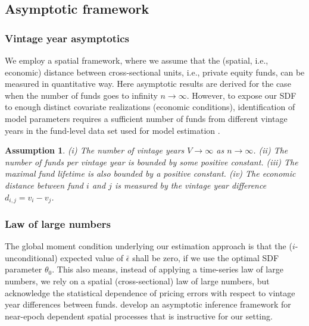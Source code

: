\documentclass[12pt]{article}
\newtheorem{assume}{Assumption}
\begin{document}
\subsection{Asymptotic framework}
\label{sec:asymptotic_framework}

\subsubsection{Vintage year asymptotics}
We employ a spatial framework, where we assume that the (spatial, i.e., economic) distance between cross-sectional units, i.e., private equity funds, can be measured in quantitative way.
Here asymptotic results are derived for the case when the number of funds goes to infinity $n \to \infty$.
However, to expose our SDF to enough distinct covariate realizations (economic conditions), identification of model parameters requires a sufficient number of funds from different vintage years in the fund-level data set used for model estimation \citep{DLP12,KN16}.
\begin{assume}
	(i) The number of vintage years $V \to \infty$ as $n \to \infty$.
	(ii) The number of funds per vintage year is bounded by some positive constant.
	(iii) The maximal fund lifetime is also bounded by a positive constant.
	(iv) The economic distance between fund $i$ and $j$ is measured by the vintage year difference $d_{i,j}=v_i - v_j$.
\end{assume}

\subsubsection{Law of large numbers}
The global moment condition underlying our estimation approach is that the ($i$-unconditional) expected value of $\bar{\epsilon}$ shall be zero, if we use the optimal SDF parameter $\theta_0$. 
This also means, instead of applying a time-series law of large numbers, we rely on a spatial (cross-sectional) law of large numbers, but acknowledge the statistical dependence of  pricing errors with respect to vintage year differences between funds.
\cite{JP12} develop an asymptotic inference framework for near-epoch dependent spatial processes that is instructive for our setting.
\end{document}

